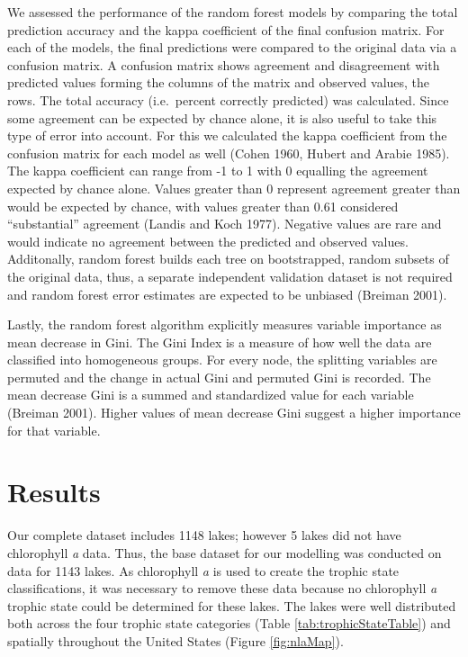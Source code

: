 \documentclass[11pt,]{article}
\begin{document}
We assessed the performance of the random forest models by comparing the
total prediction accuracy and the kappa coefficient of the final
confusion matrix. For each of the models, the final predictions were
compared to the original data via a confusion matrix. A confusion matrix
shows agreement and disagreement with predicted values forming the
columns of the matrix and observed values, the rows. The total accuracy
(i.e.~percent correctly predicted) was calculated. Since some agreement
can be expected by chance alone, it is also useful to take this type of
error into account. For this we calculated the kappa coefficient from
the confusion matrix for each model as well (Cohen 1960, Hubert and
Arabie 1985). The kappa coefficient can range from -1 to 1 with 0
equalling the agreement expected by chance alone. Values greater than 0
represent agreement greater than would be expected by chance, with
values greater than 0.61 considered ``substantial'' agreement (Landis
and Koch 1977). Negative values are rare and would indicate no agreement
between the predicted and observed values. Additonally, random forest
builds each tree on bootstrapped, random subsets of the original data,
thus, a separate independent validation dataset is not required and
random forest error estimates are expected to be unbiased (Breiman
2001).

Lastly, the random forest algorithm explicitly measures variable
importance as mean decrease in Gini. The Gini Index is a measure of how
well the data are classified into homogeneous groups. For every node,
the splitting variables are permuted and the change in actual Gini and
permuted Gini is recorded. The mean decrease Gini is a summed and
standardized value for each variable (Breiman 2001). Higher values of
mean decrease Gini suggest a higher importance for that variable.

\section{Results}\label{results}

Our complete dataset includes 1148 lakes; however 5 lakes did not have
chlorophyll \emph{a} data. Thus, the base dataset for our modelling was
conducted on data for 1143 lakes. As chlorophyll \emph{a} is used to
create the trophic state classifications, it was necessary to remove
these data because no chlorophyll \emph{a} trophic state could be
determined for these lakes. The lakes were well distributed both across
the four trophic state categories (Table \ref{tab:trophicStateTable})
and spatially throughout the United States (Figure \ref{fig:nlaMap}).
\end{document}
